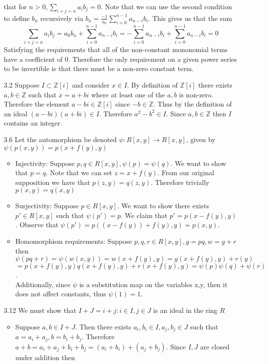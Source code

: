 \documentclass[12pt, letterpaper]{article}
\newcommand{\Z}{\mathbb{Z}}
\begin{document}
\begin{enumerate}
	that for $n > 0, \sum_{i+j = n} a_i b_j = 0$.  Note that we can use the 
	second condition to define $b_n$ recursively via $b_n = \frac{-1}{a_0}\sum_{i=0}^{n-1}a_{n-i} b_i$.  This gives us that the sum 
	$$
		\sum_{i+j = n} a_i b_j  = a_0 b_n + \sum_{i=0}^{n-1} a_{n-i}b_i = 
		-\sum_{i=0}^{n-1}a_{n-i} b_i + \sum_{i=0}^{n-1}a_{n-i} b_i = 0	
	$$
	Satisfying the requirements that all of the non-constant mononomial terms 
	have a coefficient of 0.  Therefore the only requirement on a given power series
	to be invertible is that there must be a non-zero constant term.  
	\item[3.2] Suppose $I \subset \Z[i]$ and consider $x \in I$.  
	By definition of $\Z[i]$ there exists $a,b \in \Z$ such that $x = a+ bi$ where at least one of the $a,b$ is non-zero.  Therefore the element $a-bi \in \Z[i]$ since $-b \in \Z$.  Thus
	by the definition of an ideal $(a-bi)(a+bi) \in I$.  Therefore
	$a^2 - b^2 \in I$.  Since $a,b \in \Z$ then $I$ contains an integer.	
	\item[3.6]  Let the automorphism be denoted $\psi : R[x,y] \to R[x,y]$, given 
	by $\psi(p(x,y)) = p(x+f(y),y)$
	\begin{itemize}
		\item Injectivity: Suppose $p,q \in R[x,y], \psi(p) = \psi(q)$.  We want to show 	that $p = q$.  Note that we can set $z = x + f(y)$.  From our original 
		supposition we have that $p(z,y) = q(z,y)$.  Therefore trivially $p(x,y) = q(x,y)$  
		\item Surjectivity: Suppose $p \in R[x,y]$.  We want to show there exists 
		$p' \in R[x,y]$ such that $\psi(p') = p$.  We claim that $p' = p(x - f(y), y)$.  Observe that $\psi(p') = p((x-f(y)) + f(y), y) = p(x,y)$. 
		\item Homomorphism requirements: Suppose $p,q,r \in R[x,y], g = pq, w = g + r$ then 
		$$\psi(pq + r) = \psi(w(x,y)) = w(x + f(y), y) = g(x + f(y),y) + r(y)$$ 
		$$= 
		p(x+f(y),y)q(x+f(y),y) + r(x+f(y),y)= \psi(p)\psi(q) + \psi(r)$$.\\
		Additionally, since $\psi$ is a substitution map on the variables x,y, 
		then it does not affect constants, thus $\psi(1) = 1$.  
	\end{itemize}
	\item[3.12] We must show that $I + J = {i+j: i \in I, j \in J}$ is an ideal in the ring $R$
	\begin{itemize}
		\item Suppose $a,b \in I + J $.  Then there exists $a_i, b_i \in I, a_j, b_j \in J$ such that $a = a_i + a_j, b= b_i + b_j$.   Therefore $a+b = a_i + a_j + b_i + b_j = (a_i + b_i) + (a_j + b_j)$.  Since $I,J$ are closed under addition then 

\end{itemize}
\end{enumerate}
\end{document}

